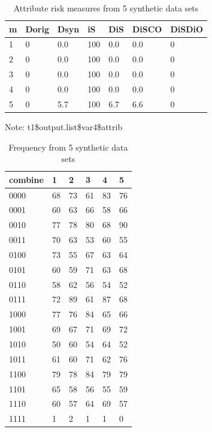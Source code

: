 \documentclass[runningheads]{llncs}
\begin{document}
\begin{table}[]
    \centering
    \caption{Attribute risk measures from 5 synthetic data sets}
    \begin{tabular}{lllllll}
        \toprule
            m &   Dorig & Dsyn & iS & DiS & DiSCO & DiSDiO \\ \midrule
            1 &    0 &  0.0 & 100 & 0.0 &   0.0 &      0 \\
            2 &     0 &  0.0 & 100 & 0.0 &   0.0 &      0 \\
            3 &     0 &  0.0 & 100 & 0.0 &   0.0 &      0 \\
            4 &     0 &  0.0 & 100 & 0.0 &   0.0 &      0 \\ 
            5 &     0 &  5.7 & 100 & 6.7 &   6.6 &      0 \\ 
        \bottomrule
    \end{tabular}
    \label{table:attribute_disclosure_risk_5}
    \vspace{0.5em} %
    \noindent\parbox{0.8\textwidth}{\footnotesize Note: t1\$output.list\$var4\$attrib}
\end{table}

\begin{table}[]
    \centering
    \caption{Frequency from 5 synthetic data sets}
    \begin{tabular}{llllll}
        \toprule
        combine & 1 & 2 & 3 & 4 & 5 \\ \midrule
        0000 & 68 & 73 & 61 & 83 & 76 \\
        0001 & 60 & 63 & 66 & 58 & 66 \\
        0010 & 77 & 78 & 80 & 68 & 90 \\
        0011 & 70 & 63 & 53 & 60 & 55 \\
        0100 & 73 & 55 & 67 & 63 & 64 \\
        0101 & 60 & 59 & 71 & 63 & 68 \\
        0110 & 58 & 62 & 56 & 54 & 52 \\
        0111 & 72 & 89 & 61 & 87 & 68 \\
        1000 & 77 & 76 & 84 & 65 & 66 \\
        1001 & 69 & 67 & 71 & 69 & 72 \\
        1010 & 50 & 60 & 54 & 64 & 52 \\
        1011 & 61 & 60 & 71 & 62 & 76 \\
        1100 & 79 & 78 & 84 & 79 & 79 \\
        1101 & 65 & 58 & 56 & 55 & 59 \\
        1110 & 60 & 57 & 64 & 69 & 57 \\
        1111 & 1  & 2  & 1  & 1  & 0  \\
        \bottomrule
    \end{tabular}
    \label{table:frequency_5_data_sets}
\end{table}
\end{document}
